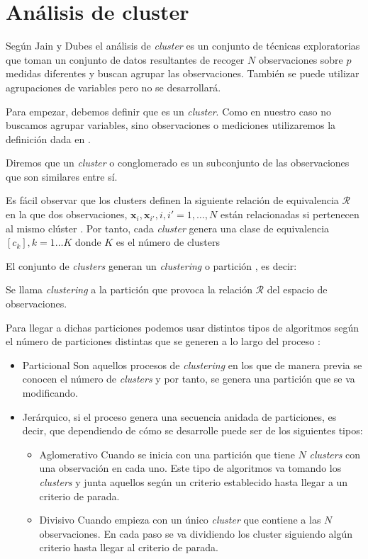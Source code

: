 \section{Análisis de cluster}

\noindent Según Jain y Dubes  el análisis de \emph{cluster} es un conjunto de técnicas exploratorias que toman un conjunto de datos resultantes de recoger $N$ observaciones sobre $p$ medidas diferentes y buscan agrupar las observaciones. También se puede utilizar agrupaciones de variables pero no se desarrollará.

\noindent Para empezar, debemos definir que es un \emph{cluster}. Como en nuestro caso no buscamos agrupar variables, sino observaciones o mediciones utilizaremos la definición dada en \cite{Everitt 2011}.

\begin{defi}
Diremos que un \emph{cluster} o conglomerado es un subconjunto de las observaciones que son similares entre sí. 
\end{defi}

\noindent Es fácil observar que los clusters definen la siguiente relación de equivalencia $\mathcal{R}$ en la que dos observaciones, $\mathbf{x}_i,\mathbf{x}_{i'}, i,i'=1, \ldots, N$ están relacionadas si pertenecen al mismo clúster \cite{Cuadras 2014}. Por tanto, cada \emph{cluster} genera una clase de equivalencia $[c_k], k=1\ldots K$ donde $K$ es el número de clusters

\noindent El conjunto de \emph{clusters} generan un \emph{clustering} o partición , es decir:
\begin{defi}
Se llama \textit{clustering} a la partición que provoca la relación $\mathcal{R}$ del espacio de observaciones. 
\end{defi}

\noindent Para llegar a dichas particiones podemos usar distintos tipos de algoritmos según el número de particiones distintas que se generen a lo largo del proceso \cite{Jain 1988}:
\begin{itemize}
\item Particional Son aquellos procesos de \emph{clustering} en los que de manera previa se conocen el número de \emph{clusters} y por tanto, se genera una partición que se va modificando.
\item Jerárquico, si el proceso genera una secuencia anidada de particiones, es decir, que dependiendo de cómo se desarrolle puede ser de los siguientes tipos:
\begin{itemize}
\item Aglomerativo Cuando se inicia con una partición que tiene $N$ \emph{clusters} con una observación en cada uno. Este tipo de algoritmos va tomando los \emph{clusters} y junta aquellos según un criterio establecido hasta llegar a un criterio de parada. 
\item Divisivo Cuando empieza con un único \emph{cluster} que contiene a las $N$ observaciones. En cada paso se va dividiendo los cluster siguiendo algún criterio hasta llegar al criterio de parada. 
\end{itemize}
\end{itemize}

